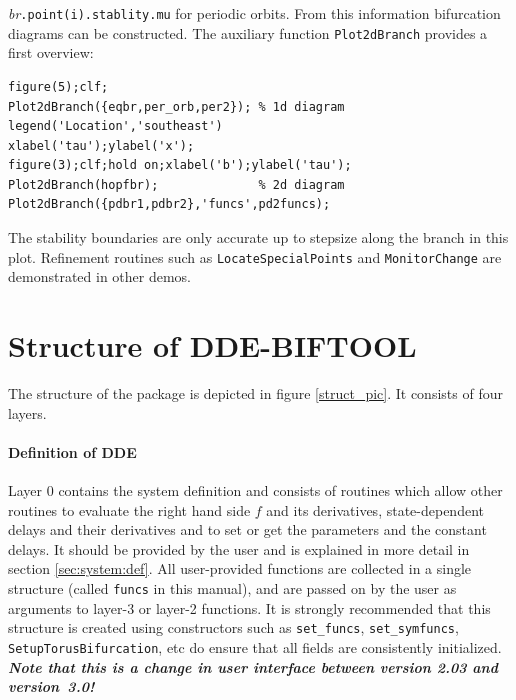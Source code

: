 \documentclass[10pt]{scrartcl}
\newcommand{\DDEBIFCODE}{\textsc{DDE-BIFTOOL}}
\newcommand{\blist}[1]{\mbox{\lstinline!#1!}}
\begin{document}
\emph{br}\blist{.point(i).stablity.mu} for periodic orbits. From this
information bifurcation diagrams can be constructed. The auxiliary
function \blist{Plot2dBranch} provides a first overview:
\begin{lstlisting}
figure(5);clf;
Plot2dBranch({eqbr,per_orb,per2}); % 1d diagram
legend('Location','southeast')
xlabel('tau');ylabel('x');
figure(3);clf;hold on;xlabel('b');ylabel('tau');
Plot2dBranch(hopfbr);              % 2d diagram
Plot2dBranch({pdbr1,pdbr2},'funcs',pd2funcs);
\end{lstlisting}
The stability boundaries are only accurate up to stepsize along the
branch in this plot. Refinement routines such as
\blist{LocateSpecialPoints} and \blist{MonitorChange} are
demonstrated in other demos.

\section{Structure of {\DDEBIFCODE}}\label{code_struct}

The structure of the package is depicted in figure \ref{struct_pic}.
It consists of four layers. 

\paragraph{Definition of DDE}
Layer 0 contains the system definition and consists of routines which
allow other routines to evaluate the right hand side $f$ and its
derivatives, state-dependent delays and their derivatives and to set
or get the parameters and the constant delays.  It should be provided
by the user and is explained in more detail in section
\ref{sec:system:def}.  All user-provided functions are collected in a
single structure (called \blist{funcs} in this manual), and are passed
on by the user as arguments to layer-3 or layer-2 functions. It is
strongly recommended that this structure is created using constructors
such as \blist{set_funcs}, \blist{set_symfuncs},
\blist{SetupTorusBifurcation}, etc do ensure that all fields are
consistently initialized. \textbf{\emph{Note that this is a change in
    user interface between version 2.03 and version~3.0!}}
\end{document}
